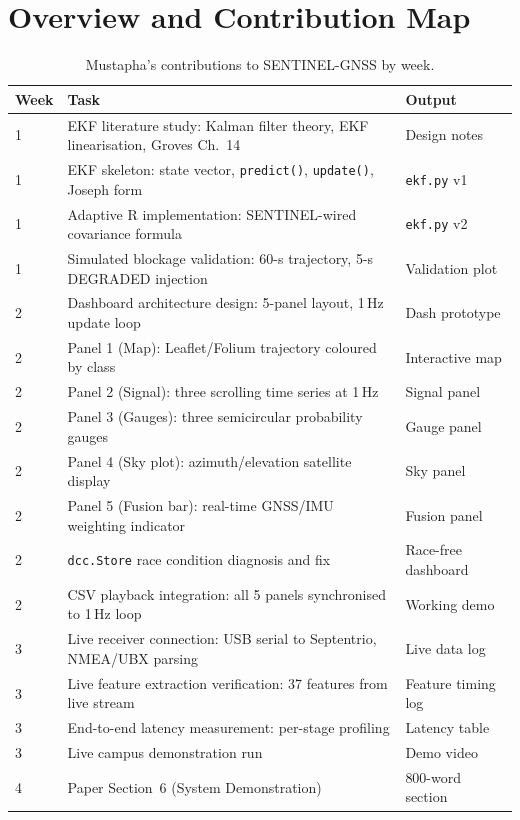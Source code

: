 \documentclass[12pt,a4paper]{article}
\newcommand{\code}[1]{\texttt{#1}}
\begin{document}
\tableofcontents
\newpage

\section{Overview and Contribution Map}

\begin{table}[H]
  \centering
  \caption{Mustapha's contributions to SENTINEL-GNSS by week.}
  \begin{tabularx}{\textwidth}{lXl}
    \toprule
    \textbf{Week} & \textbf{Task} & \textbf{Output} \\
    \midrule
    1 & EKF literature study: Kalman filter theory, EKF linearisation, Groves Ch.~14 \cite{groves2013gnss} &
        Design notes \\
    1 & EKF skeleton: state vector, \code{predict()}, \code{update()}, Joseph form &
        \code{ekf.py} v1 \\
    1 & Adaptive R implementation: SENTINEL-wired covariance formula & \code{ekf.py} v2 \\
    1 & Simulated blockage validation: 60-s trajectory, 5-s DEGRADED injection &
        Validation plot \\
    2 & Dashboard architecture design: 5-panel layout, 1\,Hz update loop &
        Dash prototype \\
    2 & Panel 1 (Map): Leaflet/Folium trajectory coloured by class &
        Interactive map \\
    2 & Panel 2 (Signal): three scrolling time series at 1\,Hz &
        Signal panel \\
    2 & Panel 3 (Gauges): three semicircular probability gauges &
        Gauge panel \\
    2 & Panel 4 (Sky plot): azimuth/elevation satellite display &
        Sky panel \\
    2 & Panel 5 (Fusion bar): real-time GNSS/IMU weighting indicator &
        Fusion panel \\
    2 & \code{dcc.Store} race condition diagnosis and fix &
        Race-free dashboard \\
    2 & CSV playback integration: all 5 panels synchronised to 1\,Hz loop &
        Working demo \\
    3 & Live receiver connection: USB serial to Septentrio, NMEA/UBX parsing &
        Live data log \\
    3 & Live feature extraction verification: 37 features from live stream &
        Feature timing log \\
    3 & End-to-end latency measurement: per-stage profiling &
        Latency table \\
    3 & Live campus demonstration run &
        Demo video \\
    4 & Paper Section~6 (System Demonstration) &
        800-word section \\
    \bottomrule
  \end{tabularx}
\end{table}
\end{document}
